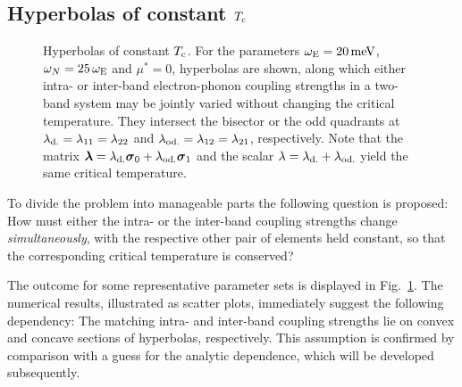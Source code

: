\subsection{Hyperbolas of constant $T \sub c$}

\begin{figure}
    \small
    
    
    
    
    
    
    \caption[Hyperbolas of constant $T \sub c$]{
        Hyperbolas of constant $T \sub c$. For the parameters $\omega \sb{\text{E}} = 20
        \, \mathrm{meV}$, $\omega_N = 25 \, \omega \sb{\text{E}}$ and $\mu^* = 0$,
        hyperbolas are shown, along which either intra- or inter-band
        electron-phonon coupling strengths in a two-band system may be jointly
        varied without changing the critical temperature. They intersect the
        bisector or the odd quadrants at $\lambda \sb{\text{d.}} = \lambda_{1 1} =
        \lambda_{2 2}$ and $\lambda \sb{\text{od.}} = \lambda_{1 2} = \lambda_{2 1}$,
        respectively. Note that the matrix $\boldsymbol \lambda = \lambda \sb{\text{d.}} \boldsymbol
        \sigma_0 + \lambda \sb{\text{od.}} \boldsymbol \sigma_1$ and the scalar $\lambda =
        \lambda \sb{\text{d.}} + \lambda \sb{\text{od.}}$ yield the same critical
        temperature.}
    \label{hyperbolas of constant Tc}
\end{figure}
%
To divide the problem into manageable parts the following question is proposed:
How must either the intra- or the inter-band coupling strengths change
\emph{simultaneously}, with the respective other pair of elements held constant,
so that the corresponding critical temperature is conserved?

The outcome for some representative parameter sets is displayed in
Fig.~\ref{hyperbolas of constant Tc}. The numerical results, illustrated as
scatter plots, immediately suggest the following dependency: The matching intra-
and inter-band coupling strengths lie on convex and concave sections of
hyperbolas, respectively. This assumption is confirmed by comparison with a
guess for the analytic dependence, which will be developed subsequently.

